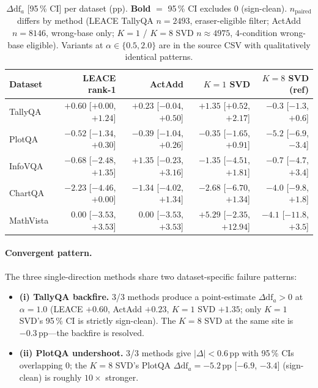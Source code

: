 \documentclass[11pt]{article}
\begin{document}
\begin{table}[h]
  \centering
  \small
  \begin{tabular}{lrrrr}
    \toprule
    \textbf{Dataset} & \textbf{LEACE rank-1} & \textbf{ActAdd} & \textbf{$K{=}1$ SVD} & \textbf{$K{=}8$ SVD (ref)} \\
    \midrule
    TallyQA   & $+0.60$ [$+0.00$, $+1.24$]   & $+0.23$ [$-0.04$, $+0.50$]   & $\mathbf{+1.35}$ [$+0.52$, $+2.17$]  & $-0.3$ [$-1.3$, $+0.6$] \\
    PlotQA    & $-0.52$ [$-1.34$, $+0.30$]   & $-0.39$ [$-1.04$, $+0.26$]   & $-0.35$ [$-1.65$, $+0.91$]            & $\mathbf{-5.2}$ [$-6.9$, $-3.4$] \\
    InfoVQA   & $-0.68$ [$-2.48$, $+1.35$]   & $+1.35$ [$-0.23$, $+3.16$]   & $-1.35$ [$-4.51$, $+1.81$]            & $-0.7$ [$-4.7$, $+3.4$] \\
    ChartQA   & $-2.23$ [$-4.46$, $+0.00$]   & $-1.34$ [$-4.02$, $+1.34$]   & $-2.68$ [$-6.70$, $+1.34$]            & $-4.0$ [$-9.8$, $+1.8$] \\
    MathVista & $0.00$ [$-3.53$, $+3.53$]    & $0.00$ [$-3.53$, $+3.53$]    & $+5.29$ [$-2.35$, $+12.94$]           & $-4.1$ [$-11.8$, $+3.5$] \\
    \bottomrule
  \end{tabular}
  \caption{$\Delta \mathrm{df}_a$ [95\,\% CI] per dataset (pp). \textbf{Bold} $=$ 95\,\% CI excludes 0 (sign-clean). $n_\text{paired}$ differs by method (LEACE TallyQA $n=2493$, eraser-eligible filter; ActAdd $n=8146$, wrong-base only; $K{=}1$ / $K{=}8$ SVD $n \approx 4975$, 4-condition wrong-base eligible). Variants at $\alpha \in \{0.5, 2.0\}$ are in the source CSV with qualitatively identical patterns.}
  \label{tab:single-direction-deltas}
\end{table}

\paragraph{Convergent pattern.} The three single-direction methods share two dataset-specific failure patterns:
\begin{itemize}
  \item \textbf{(i) TallyQA backfire.} 3/3 methods produce a point-estimate $\Delta \mathrm{df}_a > 0$ at $\alpha = 1.0$ (LEACE $+0.60$, ActAdd $+0.23$, $K{=}1$ SVD $+1.35$; only $K{=}1$ SVD's 95\,\% CI is strictly sign-clean). The $K{=}8$ SVD at the same site is $-0.3$\,pp---the backfire is resolved.
  \item \textbf{(ii) PlotQA undershoot.} 3/3 methods give $|\Delta| < 0.6$\,pp with 95\,\% CIs overlapping 0; the $K{=}8$ SVD's PlotQA $\Delta \mathrm{df}_a = -5.2$\,pp [$-6.9$, $-3.4$] (sign-clean) is roughly $10 \times$ stronger.
\end{itemize}
\end{document}

